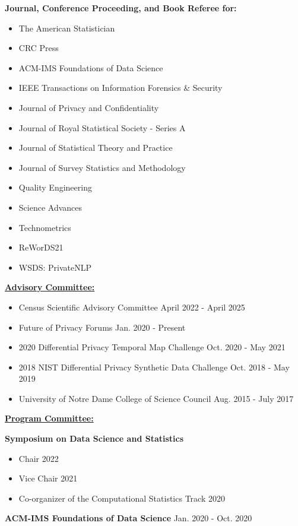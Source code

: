 \documentclass[11pt, letterpaper, roman]{moderncv} %
\begin{document}
\vspace{4pt}
\textbf{Journal, Conference Proceeding, and Book Referee for:}
\vspace{-10pt}
\begin{multicols}{2}
    \begin{itemize}
        \item The American Statistician
        \item CRC Press
        \item ACM-IMS Foundations of Data Science
        \item IEEE Transactions on Information Forensics \& Security
        \item Journal of Privacy and Confidentiality
        \item Journal of Royal Statistical Society - Series A
        \item Journal of Statistical Theory and Practice
        \item Journal of Survey Statistics and Methodology
        \item Quality Engineering
        \item Science Advances
        \item Technometrics
        \item ReWorDS21
        \item WSDS: PrivateNLP
    \end{itemize}
\end{multicols}

\underline{\textbf{\large Advisory Committee:}}\normalsize

\begin{itemize}
    \item Census Scientific Advisory Committee \hfill April 2022 - April 2025
    \item Future of Privacy Forums \hfill Jan. 2020 - Present
    \item 2020 Differential Privacy Temporal Map Challenge \hfill Oct. 2020 - May 2021
    \item 2018 NIST Differential Privacy Synthetic Data Challenge \hfill Oct. 2018 - May 2019
    \item University of Notre Dame College of Science Council \hfill Aug. 2015 - July 2017
\end{itemize}

\newpage
\underline{\textbf{\large Program Committee:}}\normalsize

\textbf{Symposium on Data Science and Statistics}
\begin{itemize}
    \item Chair \hfill 2022
    \item Vice Chair \hfill 2021
    \item Co-organizer of the Computational Statistics Track \hfill 2020
\end{itemize}
\textbf{ACM-IMS Foundations of Data Science} \hfill Jan. 2020 - Oct. 2020
\end{document}
